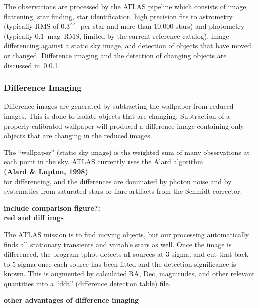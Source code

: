 \documentclass[aps,prb,twocolumn,superscriptaddress]{revtex4-1}
\def\arcsec{\ifmmode^{\prime\prime}\else$^{\prime\prime}$\fi}
\begin{document}
The observations are processed by the ATLAS pipeline which consists of
image flattening, star finding, star identification, high precision
fits to astrometry (typically RMS of 0.3\arcsec\ per star and more
than 10,000 stars) and photometry (typically 0.1~mag~RMS, limited by
the current reference catalog), image differencing against a static sky
image, and detection of objects that have moved or changed.  
Difference imaging and the detection of changing objects 
are discussed in~\cref{sec:diffimg}.


\subsubsection{Difference Imaging}\label{sec:diffimg}

Difference images are generated by subtracting the wallpaper from reduced 
images. This is done to isolate objects that are changing. Subtraction 
of a properly calibrated wallpaper will produced a difference image 
containing only objects that are changing in the reduced images.  

The ``wallpaper'' (static sky image) is the weighted sum of many 
observations at each point in the sky.  ATLAS currently uses the
Alard algorithm~\cite{Alard_algorithm}\\ 
{\bf (Alard \& Lupton, 1998)} \\ 
for differencing, and the
differences are dominated by photon noise and by systematics from
saturated stars or flare artifacts from the Schmidt corrector.

{\bf\noindent include comparison figure?:\\ \indent red and diff imgs}

The ATLAS mission is to find moving objects, but our processing
automatically finds all stationary transients and variable stars as
well.  Once the image is differenced, the program tphot detects all
sources at 3-sigma, and cut that back to 5-sigma once each source
has been fitted and the detection significance is known.  
This is augmented by calculated RA, Dec, magnitudes, and other relevant
quantities into a ``ddt'' (difference detection table) file.


{\bf other advantages of difference imaging\\}
\end{document}
